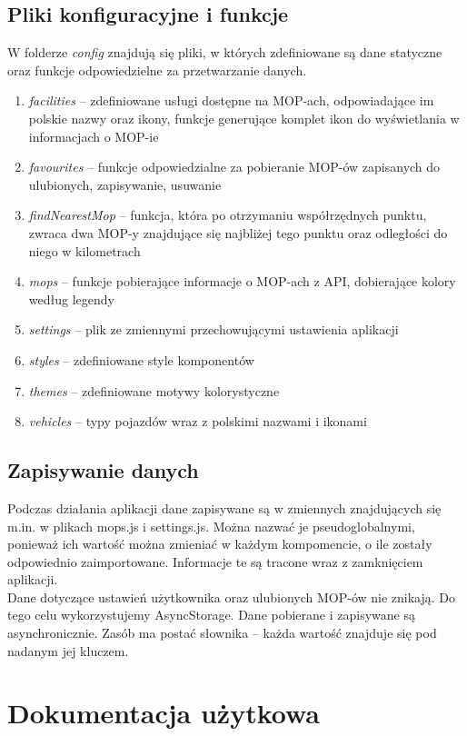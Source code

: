 \subsection{Pliki konfiguracyjne i funkcje}
W folderze \textit{config} znajdują się pliki, w których zdefiniowane są dane statyczne oraz funkcje odpowiedzielne za przetwarzanie danych.
\begin{enumerate}
\item \textit{facilities} -- zdefiniowane usługi dostępne na MOP-ach, odpowiadające im polskie nazwy oraz ikony, funkcje generujące komplet ikon do wyświetlania w informacjach o MOP-ie
\item \textit{favourites} -- funkcje odpowiedzialne za pobieranie MOP-ów zapisanych do ulubionych, zapisywanie, usuwanie
\item \textit{findNearestMop} -- funkcja, która po otrzymaniu współrzędnych punktu, zwraca dwa MOP-y znajdujące się najbliżej tego punktu oraz odległości do niego w kilometrach
\item \textit{mops} -- funkcje pobierające informacje o MOP-ach z API, dobierające kolory według legendy
\item \textit{settings} -- plik ze zmiennymi przechowującymi ustawienia aplikacji
\item \textit{styles} -- zdefiniowane style komponentów
\item \textit{themes} -- zdefiniowane motywy kolorystyczne
\item \textit{vehicles} -- typy pojazdów wraz z polskimi nazwami i ikonami
\end{enumerate}

\subsection{Zapisywanie danych}
Podczas działania aplikacji dane zapisywane są w zmiennych znajdujących się m.in. w plikach mops.js i settings.js. Można nazwać je pseudoglobalnymi, ponieważ ich wartość można zmieniać w każdym kompomencie, o ile zostały odpowiednio zaimportowane. Informacje te są tracone wraz z zamknięciem aplikacji.\\
Dane dotyczące ustawień użytkownika oraz ulubionych MOP-ów nie znikają. Do tego celu wykorzystujemy AsyncStorage. Dane pobierane i zapisywane są asynchronicznie. Zasób ma postać słownika -- każda wartość znajduje się pod nadanym jej kluczem.

\section{Dokumentacja użytkowa}

